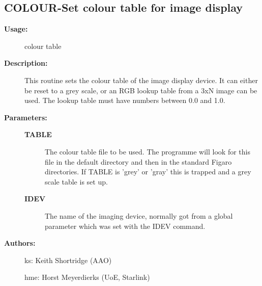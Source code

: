 \subsection{COLOUR-\label{COLOUR}Set colour table for image display}
\begin{description}

\item [\textbf{Usage:}]
 colour table

\item [\textbf{Description:}]
 This routine sets the colour table of the image display device. It
 can either be reset to a grey scale, or an RGB lookup table from a
 3xN image can be used. The lookup table must have numbers between
 0.0 and 1.0.

\item [\textbf{Parameters:}]
\begin{description}
\item [\textbf{TABLE}]
 The colour table file to be used. The programme will look for
 this file in the default directory and then in the standard
 Figaro directories. If TABLE is 'grey' or 'gray' this is
 trapped and a grey scale table is set up.
\item [\textbf{IDEV}]
 The name of the imaging device, normally got from a global
 parameter which was set with the IDEV command.
\end{description}

\item [\textbf{Authors:}]
 ks: Keith Shortridge (AAO)

 hme: Horst Meyerdierks (UoE, Starlink)

\end{description}
